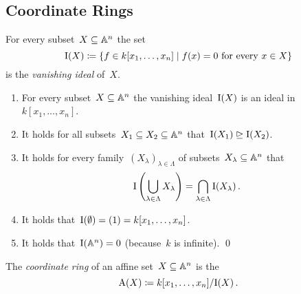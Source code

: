 \subsection{Coordinate Rings}


\begin{definition}
  For every subset~$X \subseteq \mathbb{A}^n$ the set
  \[
              \videal(X)
    \defined  \{
                f \in k[x_1, \dotsc, x_n]
              \suchthat
                \text{$f(x) = 0$ for every~$x \in X$}
              \}
  \]
  is the \emph{vanishing ideal} of~$X$.
\end{definition}


\begin{lemma}
  \label{properties of vanishing ideals}
  \leavevmode
  \begin{enumerate}
    \item
      For every subset~$X \subseteq \mathbb{A}^n$ the vanishing ideal~$\operatorname{I}(X)$ is an ideal in~$k[x_1, \dotsc, x_n]$.
    \item
      It holds for all subsets~$X_1 \subseteq X_2 \subseteq \mathbb{A}^n$ that~$\operatorname{I}(X_1) \trianglerighteq \operatorname{I}(X_2)$.
    \item
      It holds for every family~$(X_\lambda)_{\lambda \in \Lambda}$ of subsets~$X_\lambda \subseteq \mathbb{A}^n$ that
      \[
          \operatorname{I}\left( \bigcup_{\lambda \in \Lambda} X_\lambda \right)
        = \bigcap_{\lambda \in \Lambda} \operatorname{I}(X_\lambda) \,.
      \]
    \item
      It holds that~$\operatorname{I}(\emptyset) = (1) = k[x_1, \dotsc, x_n]$.
    \item
      It holds that~$\operatorname{I}(\mathbb{A}^n) = 0$ (because~$k$ is infinite).
    \qed
  \end{enumerate}
\end{lemma}


\begin{definition}
  The \emph{coordinate ring} of an affine set~$X \subseteq \mathbb{A}^n$ is the~
  \[
              \operatorname{A}(X)
    \coloneqq  k[x_1, \dotsc, x_n] / {\operatorname{I}(X)} \,.
  \]
\end{definition}


